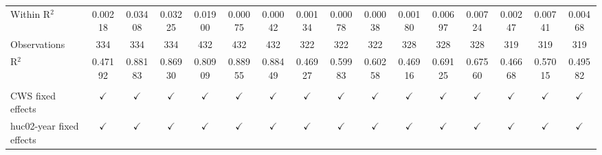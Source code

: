 \begin{table}[htbp]
\begin{adjustbox}{width = \textwidth, center}
\begin{tabular}{lccccccccccccccc}
          \\
         
         Within R$^2$                        & 0.00218           & 0.03408            & 0.03225           & 0.01900           & 0.00075            & 0.00042           & 0.00134           & 0.00078            & 0.00038           & 0.00180           & 0.00697            & 0.00724           & 0.00247           & 0.00741            & 0.00468\\  
         Observations                        & 334               & 334                & 334               & 432               & 432                & 432               & 322               & 322                & 322               & 328               & 328                & 328               & 319               & 319                & 319\\  
         R$^2$                               & 0.47192           & 0.88183            & 0.86930           & 0.80909           & 0.88955            & 0.88449           & 0.46927           & 0.59983            & 0.60258           & 0.46916           & 0.69125            & 0.67560           & 0.46668           & 0.57015            & 0.49582\\  
         
          \\
         
         CWS fixed effects                   & $\checkmark$      & $\checkmark$       & $\checkmark$      & $\checkmark$      & $\checkmark$       & $\checkmark$      & $\checkmark$      & $\checkmark$       & $\checkmark$      & $\checkmark$      & $\checkmark$       & $\checkmark$      & $\checkmark$      & $\checkmark$       & $\checkmark$\\   
         huc02-year fixed effects            & $\checkmark$      & $\checkmark$       & $\checkmark$      & $\checkmark$      & $\checkmark$       & $\checkmark$      & $\checkmark$      & $\checkmark$       & $\checkmark$      & $\checkmark$      & $\checkmark$       & $\checkmark$      & $\checkmark$      & $\checkmark$       & $\checkmark$\\   
         
         \bottomrule
         
      \end{tabular}
      
      

\end{adjustbox}
\end{table}
